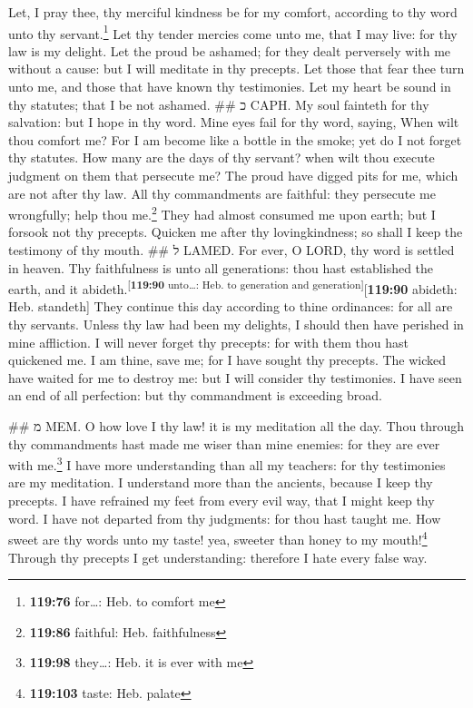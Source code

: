  Let, I pray thee, thy merciful kindness be for my
comfort, according to thy word unto thy servant.\footnote{\textbf{119:76}
  for\ldots: Heb. to comfort me}  Let thy tender mercies
come unto me, that I may live: for thy law is my delight.
 Let the proud be ashamed; for they dealt perversely with
me without a cause: but I will meditate in thy precepts. 
Let those that fear thee turn unto me, and those that have known thy
testimonies.  Let my heart be sound in thy statutes; that
I be not ashamed. \#\# כ CAPH.  My soul fainteth for thy
salvation: but I hope in thy word.  Mine eyes fail for
thy word, saying, When wilt thou comfort me?  For I am
become like a bottle in the smoke; yet do I not forget thy statutes.
 How many are the days of thy servant? when wilt thou
execute judgment on them that persecute me?  The proud
have digged pits for me, which are not after thy law. 
All thy commandments are faithful: they persecute me wrongfully; help
thou me.\footnote{\textbf{119:86} faithful: Heb. faithfulness}
 They had almost consumed me upon earth; but I forsook
not thy precepts.  Quicken me after thy lovingkindness;
so shall I keep the testimony of thy mouth. \#\# ל LAMED.
 For ever, O LORD, thy word is settled in heaven.
 Thy faithfulness is unto all generations: thou hast
established the earth, and it
abideth.\textsuperscript{{[}\textbf{119:90} unto\ldots: Heb. to
generation and generation{]}}{[}\textbf{119:90} abideth: Heb.
standeth{]}  They continue this day according to thine
ordinances: for all are thy servants.  Unless thy law had
been my delights, I should then have perished in mine affliction.
 I will never forget thy precepts: for with them thou
hast quickened me.  I am thine, save me; for I have
sought thy precepts.  The wicked have waited for me to
destroy me: but I will consider thy testimonies.  I have
seen an end of all perfection: but thy commandment is exceeding broad.

\#\# מ MEM.  O how love I thy law! it is my meditation
all the day.  Thou through thy commandments hast made me
wiser than mine enemies: for they are ever with me.\footnote{\textbf{119:98}
  they\ldots: Heb. it is ever with me}  I have more
understanding than all my teachers: for thy testimonies are my
meditation.  I understand more than the ancients,
because I keep thy precepts.  I have refrained my feet
from every evil way, that I might keep thy word.  I have
not departed from thy judgments: for thou hast taught me.
 How sweet are thy words unto my taste! yea, sweeter
than honey to my mouth!\footnote{\textbf{119:103} taste: Heb. palate}
 Through thy precepts I get understanding: therefore I
hate every false way.

